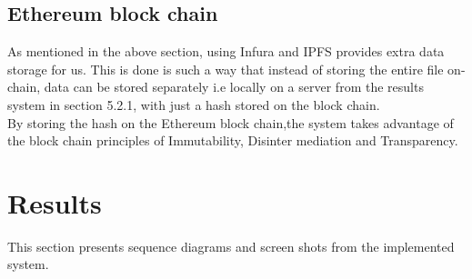 \subsection{Ethereum block chain}
As mentioned in the above section, using Infura and IPFS provides extra data storage for us. This is done is such a way that instead of storing the entire file on-chain, data can be stored separately i.e locally on a server from the results system in section 5.2.1, with just a hash stored on the block chain.\\By storing the hash on the Ethereum block chain,the system takes advantage of the block chain principles of Immutability, Disinter mediation and Transparency.
\newpage
\section{Results}
This section presents sequence diagrams and screen shots from the implemented system.
